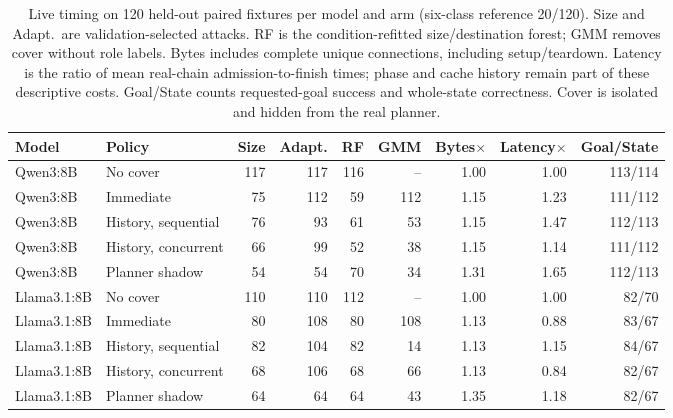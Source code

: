 \begin{table}[t]\centering\small
\caption{Live timing on 120 held-out paired fixtures per model and arm (six-class reference 20/120). Size and Adapt.\ are validation-selected attacks. RF is the condition-refitted size/destination forest; GMM removes cover without role labels. Bytes includes complete unique connections, including setup/teardown. Latency is the ratio of mean real-chain admission-to-finish times; phase and cache history remain part of these descriptive costs. Goal/State counts requested-goal success and whole-state correctness. Cover is isolated and hidden from the real planner.}
\label{tab:live-timing-main}
\setlength{\tabcolsep}{5pt}
\begin{tabularx}{\textwidth}{@{}lYrrrrrrr@{}}\toprule
Model & Policy & Size & Adapt. & RF & GMM & Bytes$\times$ & Latency$\times$ & Goal/State\\\midrule
Qwen3:8B & No cover & 117 & 117 & 116 & -- & 1.00 & 1.00 & 113/114 \\
Qwen3:8B & Immediate & 75 & 112 & 59 & 112 & 1.15 & 1.23 & 111/112 \\
Qwen3:8B & History, sequential & 76 & 93 & 61 & 53 & 1.15 & 1.47 & 112/113 \\
Qwen3:8B & History, concurrent & 66 & 99 & 52 & 38 & 1.15 & 1.14 & 111/112 \\
Qwen3:8B & Planner shadow & 54 & 54 & 70 & 34 & 1.31 & 1.65 & 112/113 \\
\midrule
Llama3.1:8B & No cover & 110 & 110 & 112 & -- & 1.00 & 1.00 & 82/70 \\
Llama3.1:8B & Immediate & 80 & 108 & 80 & 108 & 1.13 & 0.88 & 83/67 \\
Llama3.1:8B & History, sequential & 82 & 104 & 82 & 14 & 1.13 & 1.15 & 84/67 \\
Llama3.1:8B & History, concurrent & 68 & 106 & 68 & 66 & 1.13 & 0.84 & 82/67 \\
Llama3.1:8B & Planner shadow & 64 & 64 & 64 & 43 & 1.35 & 1.18 & 82/67 \\
\bottomrule\end{tabularx}
\end{table}
